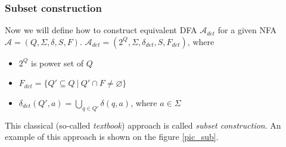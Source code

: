   \subsubsection{Subset construction}
	\label{subset}
	Now we will define how to construct equivalent DFA $\mathcal{A}_{det}$ for a given NFA $\mathcal{A}=(Q,\Sigma,\delta,S,F)$. 
  \newline
  \newline
	\label{defSubset}
	$\mathcal{A}_{det}=(2^Q,\Sigma,\delta_{det},S,F_{det})$, where
	\begin{itemize}
		\item $2^Q$ is power set of $Q$
		\item $F_{det}=\{Q'\subseteq Q\ |\ Q'\cap F \not = \varnothing\}$
		\item $\delta_{det}(Q',a)=\bigcup\limits_{q\in Q'}\delta(q,a)$, where $a\in\Sigma$
	\end{itemize}

  This classical (so-called \emph{textbook}) approach is called \emph{subset construction}.
    An example of this approach is shown on the figure \ref{pic_sub}.
	
